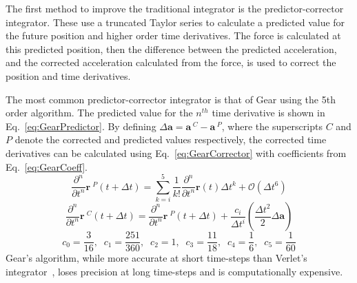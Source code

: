 \documentclass[12pt]{UoAthesis} \usepackage{booktabs}
\begin{document}
The first method to improve the traditional integrator is the
predictor-corrector integrator. These use a truncated Taylor series to
calculate a predicted value for the future position and higher order
time derivatives. The force is calculated at this predicted position,
then the difference between the predicted acceleration, and the
corrected acceleration calculated from the force, is used to correct
the position and time derivatives.

The most common predictor-corrector integrator is that of Gear
\cite{Gear1971} using the 5th order algorithm. The predicted value for
the $n^{th}$ time derivative is shown in
Eq.~\eqref{eq:GearPredictor}. By defining $\Delta \mathbf{a} =
\mathbf{a}\,^{C} - \mathbf{a}\,^{P}$, where the superscripts $C$ and
$P$ denote the corrected and predicted values respectively, the
corrected time derivatives can be calculated using
Eq.~\eqref{eq:GearCorrector} with coefficients from
Eq.~\eqref{eq:GearCoeff}.
\begin{equation}
  \frac{\partial^{n}}{\partial t^{n}} \mathbf{r}\:^{P}(t+\Delta t)
  =\sum^{5}_{k=i} \frac{1}{k!}\frac{\partial^{n} }{\partial t^{n}}
  \mathbf{r}(t) \Delta t^{k} + \mathcal{O}(\Delta t^6)
  \label{eq:GearPredictor} 
\end{equation}
\begin{equation}
  \frac{\partial^{n}}{\partial t^{n}} \mathbf{r}\:^{C}(t+\Delta t)
  =\frac{\partial^{n} }{\partial t^{n}} \mathbf{r}\:^{P}(t+\Delta t)
  +\frac{c_i}{\Delta t^i} \left(\frac{\Delta t^2}{2}\Delta \mathbf{a}\right)
  \label{eq:GearCorrector} \end{equation} 
\begin{equation} 
  c_0 =
  \frac{3}{16},\;\;c_1 = \frac{251}{360},\;\; c_2 = 1,\;\; c_3 =
  \frac{11}{18},\;\; c_4 =
  \frac{1}{6},\;\; c_5 = \frac{1}{60} \label{eq:GearCoeff} 
\end{equation}
Gear's algorithm, while more accurate at short time-steps than Verlet's
integrator~\cite{Haile1997}, loses precision at long time-steps and is
computationally expensive.  
\end{document}

